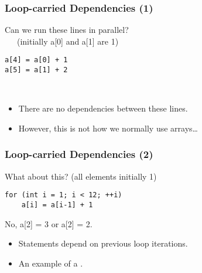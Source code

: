 \begin{frame}[fragile]
\frametitle{Loop-carried Dependencies (1)}

Can we run these lines in parallel? \\ ~~~(initially a[0] and a[1] are 1)
\begin{lstlisting}
a[4] = a[0] + 1
a[5] = a[1] + 2
\end{lstlisting}
\pause
{}\\[1em]
\begin{itemize}
\item There are no dependencies between these lines.
\item However, this is not how we normally use arrays\ldots
\end{itemize}

\end{frame}

\begin{frame}[fragile]
\frametitle{Loop-carried Dependencies (2)}

What about this? (all elements initially 1)
\begin{lstlisting}
for (int i = 1; i < 12; ++i)
    a[i] = a[i-1] + 1
\end{lstlisting}
\pause
\alert{No, a[2] = 3 or a[2] = 2.}\\[1em]
\begin{itemize}
\item Statements depend on previous loop iterations.
\item An example of a .
\end{itemize}

\end{frame}

